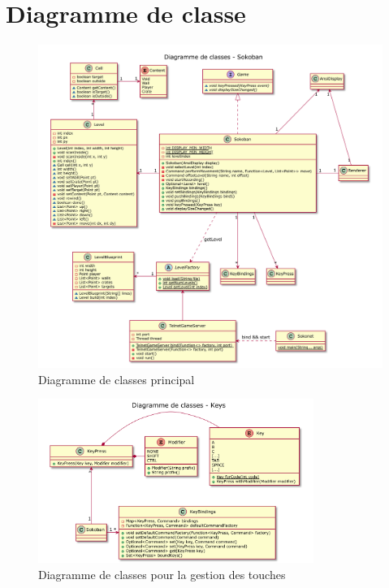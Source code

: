 \documentclass[french]{article}
\begin{document}
	\section{Diagramme de classe}
	\begin{figure}[H]
		\centering
		\includegraphics[width=\textwidth]{sokoban}
		\caption{Diagramme de classes principal}
		\label{classDiagMain}
	\end{figure}
	
	\begin{figure}[H]
		\centering
		\includegraphics[width=0.8\textwidth]{keys}
		\caption{Diagramme de classes pour la gestion des touches}
		\label{classDiagKey}
	\end{figure}
	
\end{document}
